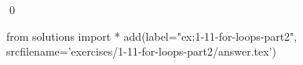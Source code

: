 
\begin{ex}
  \label{ex:1-11-for-loops-part2}
  
  \qed
\end{ex}
\begin{python0}
from solutions import *
add(label="ex:1-11-for-loops-part2",
    srcfilename='exercises/1-11-for-loops-part2/answer.tex')
\end{python0}
